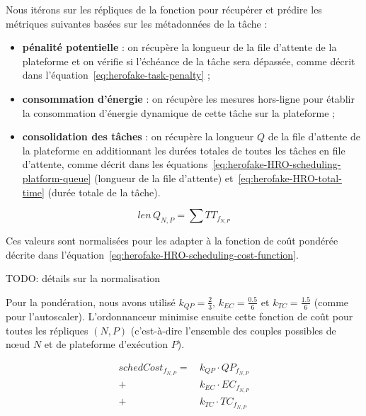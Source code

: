 Nous itérons sur les répliques de la fonction pour récupérer et prédire les métriques suivantes basées sur les métadonnées de la tâche :

\begin{itemize}
    \item \textbf{pénalité potentielle} : on récupère la longueur de la file d'attente de la plateforme et on vérifie si l'échéance de la tâche sera dépassée, comme décrit dans l'équation~\ref{eq:herofake-task-penalty} ;
    \item \textbf{consommation d'énergie} : on récupère les mesures hors-ligne pour établir la consommation d'énergie dynamique de cette tâche sur la plateforme ;
    \item \textbf{consolidation des tâches} : on récupère la longueur $Q$ de la file d'attente de la plateforme en additionnant les durées totales de toutes les tâches en file d'attente, comme décrit dans les équations~\ref{eq:herofake-HRO-scheduling-platform-queue} (longueur de la file d'attente) et~\ref{eq:herofake-HRO-total-time} (durée totale de la tâche). 
\end{itemize}

\begin{equation}
    len \, Q_{N, P} = \sum TT_{f_{N, P}}
\label{eq:herofake-HRO-scheduling-platform-queue}
\end{equation}

Ces valeurs sont normalisées pour les adapter à la fonction de coût pondérée décrite dans l'équation~\ref{eq:herofake-HRO-scheduling-cost-function}.

TODO: détails sur la normalisation

Pour la pondération, nous avons utilisé $k_{QP} = \frac{2}{3}$, $k_{EC} = \frac{0.5}{6}$ et $k_{TC} = \frac{1.5}{6}$ (comme pour l'autoscaler). L'ordonnanceur minimise ensuite cette fonction de coût pour toutes les répliques $(N, P)$ (c'est-à-dire l'ensemble des couples possibles de nœud $N$ et de plateforme d'exécution $P$).

\begin{equation}
\begin{split}
    schedCost_{{f}_{N, P}} = \, &k_{QP} \cdot QP_{{f}_{N, P}} \\
    + &k_{EC} \cdot {EC}_{{f}_{N, P}} \\
    + &k_{TC} \cdot TC_{{f}_{N, P}}
\end{split}
\label{eq:herofake-HRO-scheduling-cost-function}
\end{equation}

